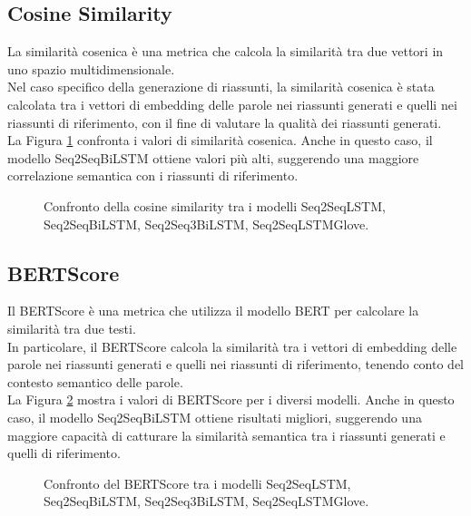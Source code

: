 \subsection{Cosine Similarity}
La similarit\`a cosenica \`e una metrica che calcola la similarit\`a tra due vettori in uno spazio multidimensionale.\\
Nel caso specifico della generazione di riassunti, la similarit\`a cosenica \`e stata calcolata tra i vettori di embedding delle parole nei riassunti generati e quelli nei riassunti di riferimento, con il fine di valutare la qualit\`a dei riassunti generati.\\
La Figura \ref{fig:cosine_similarity_comparison} confronta i valori di similarit\`a cosenica. Anche in questo caso, il modello Seq2SeqBiLSTM ottiene valori pi\`u alti, suggerendo una maggiore correlazione semantica con i riassunti di riferimento.

\begin{figure}[H]
    \centering
    \hfill
    \hfill
    \hfill
    
    \caption{Confronto della cosine similarity tra i modelli Seq2SeqLSTM, Seq2SeqBiLSTM, Seq2Seq3BiLSTM, Seq2SeqLSTMGlove.}
    \label{fig:cosine_similarity_comparison}
\end{figure}

\subsection{BERTScore}
Il BERTScore \`e una metrica che utilizza il modello BERT per calcolare la similarit\`a tra due testi.\\
In particolare, il BERTScore calcola la similarit\`a tra i vettori di embedding delle parole nei riassunti generati e quelli nei riassunti di riferimento, tenendo conto del contesto semantico delle parole.\\
La Figura \ref{fig:bert_score_comparison} mostra i valori di BERTScore per i diversi modelli. Anche in questo caso, il modello Seq2SeqBiLSTM ottiene risultati migliori, suggerendo una maggiore capacit\`a di catturare la similarit\`a semantica tra i riassunti generati e quelli di riferimento.

\begin{figure}[H]
    \centering
    \hfill
    \hfill
    \hfill
    
    \caption{Confronto del BERTScore tra i modelli Seq2SeqLSTM, Seq2SeqBiLSTM, Seq2Seq3BiLSTM, Seq2SeqLSTMGlove.}
    \label{fig:bert_score_comparison}
\end{figure}

